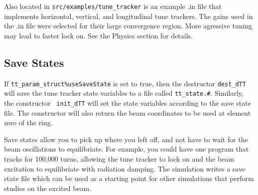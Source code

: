 Also located in {\tt src/examples/tune\_tracker} is an example .in
file that implements horizontal, vertical, and longitudinal tune
trackers.  The gains used in the .in file were selected for their
large convergence region.  More agressive tuning may lead to faster
lock on.  See the Physics section for details.

\subsection{Save States}

If {\tt tt\_param\_struct\%useSaveState} is set to true, then the
destructor {\tt dest\_dTT} will save the tune tracker state variables
to a file called {\tt tt\_state.\#}.  Similarly, the constructor {\tt
init\_dTT} will set the state variables according to the save state
file.  The constructor will also return the beam coordinates to be
used at element zero of the ring.

Save states allow you to pick up where you left off, and not have to
wait for the beam oscillations to equilibriate.  For example, you
could have one program that tracks for 100,000 turns, allowing the
tune tracker to lock on and the beam excitation to equilibriate with
radiation damping.  The simulation writes a save state file which can
be used as a starting point for other simulations that perform studies
on the excited beam.













